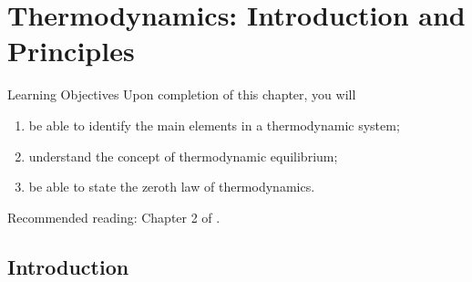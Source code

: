\chapter{Thermodynamics: Introduction and Principles}\label{Chapter:Introduction}


   \begin{LearningObjectivesBlock}{Learning Objectives}
      Upon completion of this chapter, you will
        \begin{enumerate}
           \item be able to identify the main elements in a thermodynamic system;
           \item understand the concept of thermodynamic equilibrium;
           \item be able to state the zeroth law of thermodynamics.
        \end{enumerate}
\medskip
     Recommended reading: Chapter 2 of \citet{Atkins_Book,Devoe_Book,Borgnakke_Book}.
   \end{LearningObjectivesBlock}

\localtableofcontents

   \section{Introduction}\label{Chapter:Introduction:Section:Introduction}

